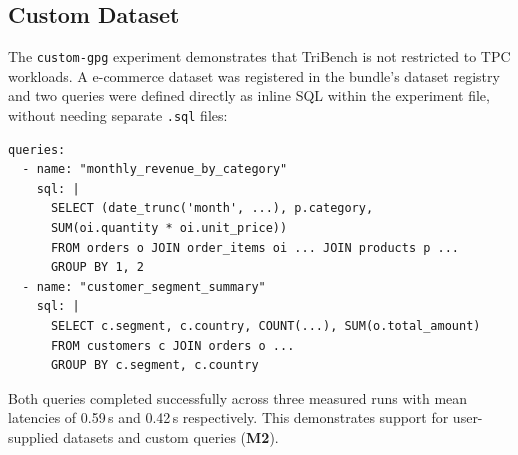 \documentclass{l4proj}
\begin{document}
\subsection{Custom Dataset}
\label{sec:eval_custom}

The \texttt{custom-gpg} experiment demonstrates that TriBench is not restricted to TPC workloads. A e-commerce dataset was registered in the bundle's dataset registry and two queries were defined directly as inline SQL within the experiment file, without needing separate \texttt{.sql} files:

\begin{lstlisting}[style=yamlstyle, caption={Custom inline SQL Defined within the experiment yaml}]
queries:
  - name: "monthly_revenue_by_category"
    sql: |
      SELECT (date_trunc('month', ...), p.category, 
      SUM(oi.quantity * oi.unit_price))
      FROM orders o JOIN order_items oi ... JOIN products p ...
      GROUP BY 1, 2
  - name: "customer_segment_summary"
    sql: |
      SELECT c.segment, c.country, COUNT(...), SUM(o.total_amount)
      FROM customers c JOIN orders o ...
      GROUP BY c.segment, c.country
\end{lstlisting}

\noindent Both queries completed successfully across three measured runs with mean latencies of 0.59\,s and 0.42\,s respectively. This demonstrates support for user-supplied datasets and custom queries (\textbf{M2}).



\end{document}

